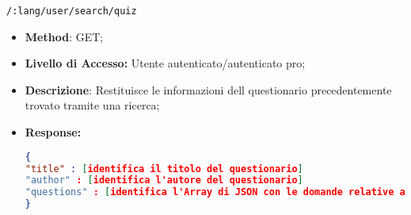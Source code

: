 	 
	\item \texttt{/:lang/user/search/quiz}
	\begin{itemize}
		\item \textbf{Method}: GET;
		\item \textbf{Livello di Accesso:} Utente autenticato/autenticato pro;
		\item \textbf{Descrizione}: Restituisce le informazioni dell questionario precedentemente trovato tramite una ricerca;
		\item \textbf{Response:} 
\begin{lstlisting}[language=json,firstnumber=1]
{
"title" : [identifica il titolo del questionario]
"author" : [identifica l'autore del questionario]
"questions" : [identifica l'Array di JSON con le domande relative al questionario]
}
\end{lstlisting}
	\end{itemize}